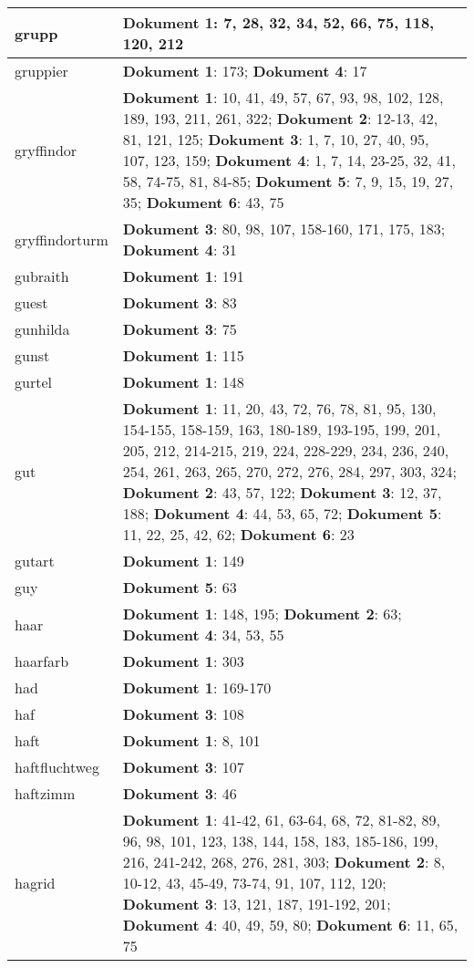 \documentclass[a5paper]{article}
\begin{document}
\begin{longtable}[l]{|l|p{3in}|}
\hline
grupp & \textbf{Dokument 1}: 7, 28, 32, 34, 52, 66, 75, 118, 120, 212 \\
\hline
gruppier & \textbf{Dokument 1}: 173; \textbf{Dokument 4}: 17 \\
\hline
gryffindor & \textbf{Dokument 1}: 10, 41, 49, 57, 67, 93, 98, 102, 128, 189, 193, 211, 261, 322; \textbf{Dokument 2}: 12-13, 42, 81, 121, 125; \textbf{Dokument 3}: 1, 7, 10, 27, 40, 95, 107, 123, 159; \textbf{Dokument 4}: 1, 7, 14, 23-25, 32, 41, 58, 74-75, 81, 84-85; \textbf{Dokument 5}: 7, 9, 15, 19, 27, 35; \textbf{Dokument 6}: 43, 75 \\
\hline
gryffindorturm & \textbf{Dokument 3}: 80, 98, 107, 158-160, 171, 175, 183; \textbf{Dokument 4}: 31 \\
\hline
gubraith & \textbf{Dokument 1}: 191 \\
\hline
guest & \textbf{Dokument 3}: 83 \\
\hline
gunhilda & \textbf{Dokument 3}: 75 \\
\hline
gunst & \textbf{Dokument 1}: 115 \\
\hline
gurtel & \textbf{Dokument 1}: 148 \\
\hline
gut & \textbf{Dokument 1}: 11, 20, 43, 72, 76, 78, 81, 95, 130, 154-155, 158-159, 163, 180-189, 193-195, 199, 201, 205, 212, 214-215, 219, 224, 228-229, 234, 236, 240, 254, 261, 263, 265, 270, 272, 276, 284, 297, 303, 324; \textbf{Dokument 2}: 43, 57, 122; \textbf{Dokument 3}: 12, 37, 188; \textbf{Dokument 4}: 44, 53, 65, 72; \textbf{Dokument 5}: 11, 22, 25, 42, 62; \textbf{Dokument 6}: 23 \\
\hline
gutart & \textbf{Dokument 1}: 149 \\
\hline
guy & \textbf{Dokument 5}: 63 \\
\hline
haar & \textbf{Dokument 1}: 148, 195; \textbf{Dokument 2}: 63; \textbf{Dokument 4}: 34, 53, 55 \\
\hline
haarfarb & \textbf{Dokument 1}: 303 \\
\hline
had & \textbf{Dokument 1}: 169-170 \\
\hline
haf & \textbf{Dokument 3}: 108 \\
\hline
haft & \textbf{Dokument 1}: 8, 101 \\
\hline
haftfluchtweg & \textbf{Dokument 3}: 107 \\
\hline
haftzimm & \textbf{Dokument 3}: 46 \\
\hline
hagrid & \textbf{Dokument 1}: 41-42, 61, 63-64, 68, 72, 81-82, 89, 96, 98, 101, 123, 138, 144, 158, 183, 185-186, 199, 216, 241-242, 268, 276, 281, 303; \textbf{Dokument 2}: 8, 10-12, 43, 45-49, 73-74, 91, 107, 112, 120; \textbf{Dokument 3}: 13, 121, 187, 191-192, 201; \textbf{Dokument 4}: 40, 49, 59, 80; \textbf{Dokument 6}: 11, 65, 75 \\

\end{longtable}
\end{document}

